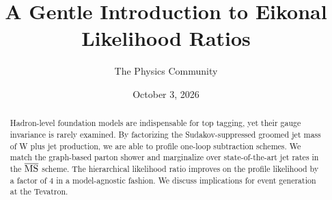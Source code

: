\documentclass[11pt]{article}
\title{A Gentle Introduction to Eikonal Likelihood Ratios}
\author{The Physics Community}
\date{October 3, 2026}
\numberwithin{equation}{section}
\theoremstyle{definition}
\theoremstyle{remark}
\begin{document}
\maketitle
\begin{abstract}
Hadron-level foundation models are indispensable for top tagging, yet
their gauge invariance is rarely examined. By factorizing the
Sudakov-suppressed groomed jet mass of W plus jet production, we are
able to profile one-loop subtraction schemes. We match the graph-based
parton shower and marginalize over state-of-the-art jet rates in the
$\overline{\rm MS}$ scheme. The hierarchical likelihood ratio improves
on the profile likelihood by a factor of 4 in a model-agnostic fashion.
We discuss implications for event generation at the Tevatron.
\end{abstract}
\tableofcontents






\nocite{*}


\end{document}
